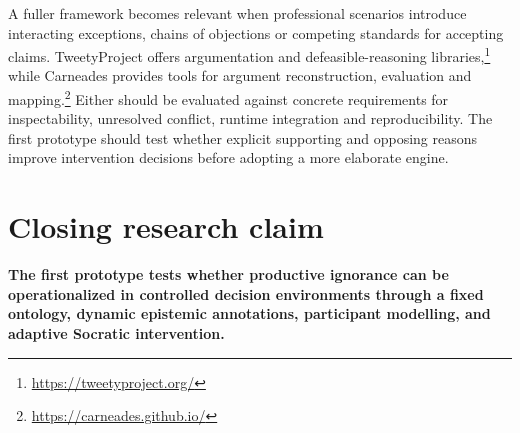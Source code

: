 \documentclass[11pt,a4paper]{article}
\begin{document}
A fuller framework becomes relevant when professional scenarios introduce interacting exceptions, chains of objections or competing standards for accepting claims. TweetyProject offers argumentation and defeasible-reasoning libraries,\footnote{\url{https://tweetyproject.org/}} while Carneades provides tools for argument reconstruction, evaluation and mapping.\footnote{\url{https://carneades.github.io/}} Either should be evaluated against concrete requirements for inspectability, unresolved conflict, runtime integration and reproducibility. The first prototype should test whether explicit supporting and opposing reasons improve intervention decisions before adopting a more elaborate engine.

\section{Closing research claim}

\textbf{The first prototype tests whether productive ignorance can be operationalized in controlled decision environments through a fixed ontology, dynamic epistemic annotations, participant modelling, and adaptive Socratic intervention.}
\end{document}
